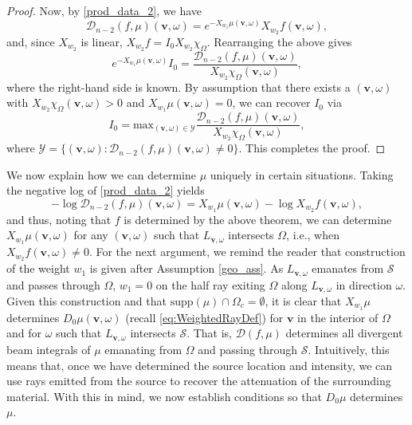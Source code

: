 \documentclass[a4paper,12pt]{amsart}
\numberwithin{equation}{section}
\theoremstyle{plain}
\numberwithin{theorem}{section}
\theoremstyle{definition}
\theoremstyle{remark}
\theoremstyle{remark}
\theoremstyle{remark}
\newcommand{\s}{\mathcal S}
\newcommand{\vv}{{\mathbf{v}}}
\begin{document}
{\begin{proof}
Now, by \eqref{prod_data_2}, we have
\begin{equation}
\mathcal{D}_{n-2}(f,\mu)(\vv,\omega) = e^{ -X_{w_1}\mu(\vv,\omega) }  X_{w_2}f(\vv,\omega),
\end{equation}
and, since $X_{w_2}$ is linear, $X_{w_2}f = I_0X_{w_2}\chi_\Omega$. Rearranging the above gives
\begin{equation}
e^{ -X_{w_1}\mu(\vv,\omega) }I_0 = \frac{ \mathcal{D}_{n-2}(f,\mu)(\vv,\omega) }{X_{w_2}\chi_\Omega(\vv,\omega) },
\end{equation}
where the right-hand side is known. By assumption that there exists a $(\vv,\omega)$ with $X_{w_2}\chi_\Omega(\vv,\omega) > 0$ and $X_{w_1}\mu(\vv,\omega) = 0$, we can recover $I_0$ via
$$I_0 = \text{max}_{(\vv,\omega) \in \mathcal{Y}} \frac{ \mathcal{D}_{n-2}(f,\mu)(\vv,\omega) }{X_{w_2}\chi_\Omega(\vv,\omega) },$$
where $\mathcal{Y} = \{(\vv,\omega) : \mathcal{D}_{n-2}(f,\mu)(\vv,\omega) \neq 0\}$. This completes the proof.
\end{proof}

We now explain how we can determine $\mu$ uniquely in certain situations. Taking the negative log of \eqref{prod_data_2} yields
\begin{equation}\label{recov_mu}
-\log \mathcal{D}_{n-2}(f,\mu)(\vv,\omega) = X_{w_1}\mu(\vv,\omega) - \log X_{w_2}f(\vv,\omega),
\end{equation}
and thus, noting that $f$ is determined by the above theorem, we can determine $X_{w_1}\mu(\vv,\omega)$ for any $(\vv,\omega)$ such that $L_{\vv,\omega}$ intersects $\Omega$, i.e., when $X_{w_2}f(\vv,\omega) \neq 0$. For the next argument, we remind the reader that construction of the weight $w_1$ is given after Assumption \ref{geo_ass}. As $L_{\vv,\omega}$ emanates from $\s$ and passes through $\Omega$, $w_1 = 0$ on the half ray exiting $\Omega$ along $L_{\vv,\omega}$ in direction $\omega$. Given this construction and that $\text{supp}(\mu) \cap \Omega_c = \emptyset$, it is clear that $ X_{w_1}\mu$ determines $D_0\mu(\vv,\omega)$ (recall \eqref{eq:WeightedRayDef}) for $\vv$ in the interior of $\Omega$ and for $\omega$ such that $L_{\vv,\omega}$ intersects $\s$. That is, $\mathcal{D}(f,\mu)$ determines all divergent beam integrals of $\mu$ emanating from $\Omega$ and passing through $\s$. Intuitively, this means that, once we have determined the source location and intensity, we can use rays emitted from the source to recover the attenuation of the surrounding material. With this in mind, we now establish conditions so that $D_0\mu$ determines $\mu$. 

}
\end{document}
